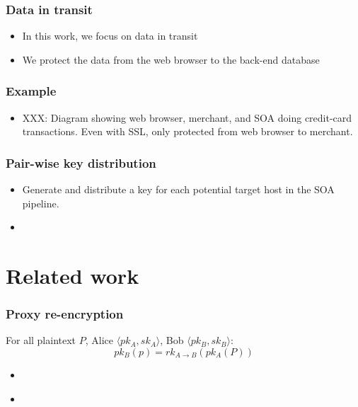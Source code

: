\documentclass{beamer}
\begin{document}
\begin{frame}
\frametitle{Data in transit}
\begin{itemize}
\item In this work, we focus on data in transit
\item We protect the data from the web browser to the back-end database
\end{itemize}
\end{frame}

\begin{frame}
\frametitle{Example}
\begin{itemize}
\item XXX: Diagram showing web browser, merchant, and SOA doing credit-card
transactions.  Even with SSL, only protected from web browser to merchant.
\end{itemize}
\end{frame}

\begin{frame}
\frametitle{Pair-wise key distribution}
\begin{itemize}
\item Generate and distribute a key for each potential target host in the SOA
pipeline.  
\item 
\end{itemize}
\end{frame}

\section{Related work}


\begin{frame}
\frametitle{Proxy re-encryption}
For all plaintext $P$, Alice $\langle pk_A, sk_A \rangle$, Bob $\langle pk_B,
sk_B \rangle$:
\begin{equation*}
pk_B(p) = rk_{A \to B}( pk_A (P))
\end{equation*}
\begin{itemize}
\item \cite{atomic_proxy_reencryption} 
\item \cite{proxy_reencryption}
\end{itemize}
\end{frame}
\end{document}
